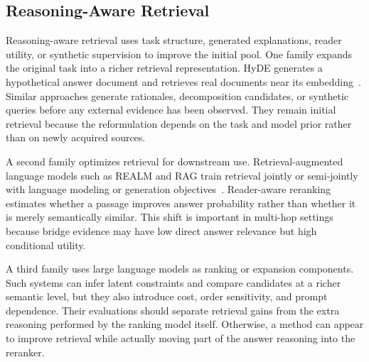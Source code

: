 \subsection{Reasoning-Aware Retrieval}
\label{subsec:reasoning_aware_retrieval}

Reasoning-aware retrieval uses task structure, generated explanations, reader utility, or synthetic supervision to improve the initial pool. One family expands the original task into a richer retrieval representation. HyDE generates a hypothetical answer document and retrieves real documents near its embedding~\cite{gao2023hyde}. Similar approaches generate rationales, decomposition candidates, or synthetic queries before any external evidence has been observed. They remain initial retrieval because the reformulation depends on the task and model prior rather than on newly acquired sources.

A second family optimizes retrieval for downstream use. Retrieval-augmented language models such as REALM and RAG train retrieval jointly or semi-jointly with language modeling or generation objectives~\cite{guu2020realm,lewis2020rag}. Reader-aware reranking estimates whether a passage improves answer probability rather than whether it is merely semantically similar. This shift is important in multi-hop settings because bridge evidence may have low direct answer relevance but high conditional utility.

A third family uses large language models as ranking or expansion components. Such systems can infer latent constraints and compare candidates at a richer semantic level, but they also introduce cost, order sensitivity, and prompt dependence. Their evaluations should separate retrieval gains from the extra reasoning performed by the ranking model itself. Otherwise, a method can appear to improve retrieval while actually moving part of the answer reasoning into the reranker.

